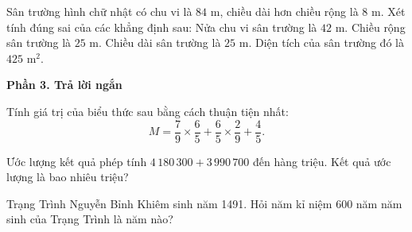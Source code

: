 \begin{ex} %
Sân trường hình chữ nhật có chu vi là $84\text{ m}$, chiều dài hơn chiều rộng là $8\text{ m}$. Xét tính đúng sai của các khẳng định sau:
\choiceTF
{\True Nửa chu vi sân trường là $42\text{ m}$.}
{Chiều rộng sân trường là $25\text{ m}$.}
{\True Chiều dài sân trường là $25\text{ m}$.}
{\True Diện tích của sân trường đó là $425\text{ m}^2$.}
\end{ex}

\textbf{Phần 3. Trả lời ngắn}

\begin{ex} %
Tính giá trị của biểu thức sau bằng cách thuận tiện nhất:
\[
M = \dfrac{7}{9} \times \dfrac{6}{5} + \dfrac{6}{5} \times \dfrac{2}{9} + \dfrac{4}{5}.
\]
\end{ex}

\begin{ex} %
Ước lượng kết quả phép tính $4\,180\,300 + 3\,990\,700$ đến hàng triệu. Kết quả ước lượng là bao nhiêu triệu?
\end{ex}

\begin{ex} %
Trạng Trình Nguyễn Bỉnh Khiêm sinh năm 1491. Hỏi năm kỉ niệm 600 năm năm sinh của Trạng Trình là năm nào?
\end{ex}

